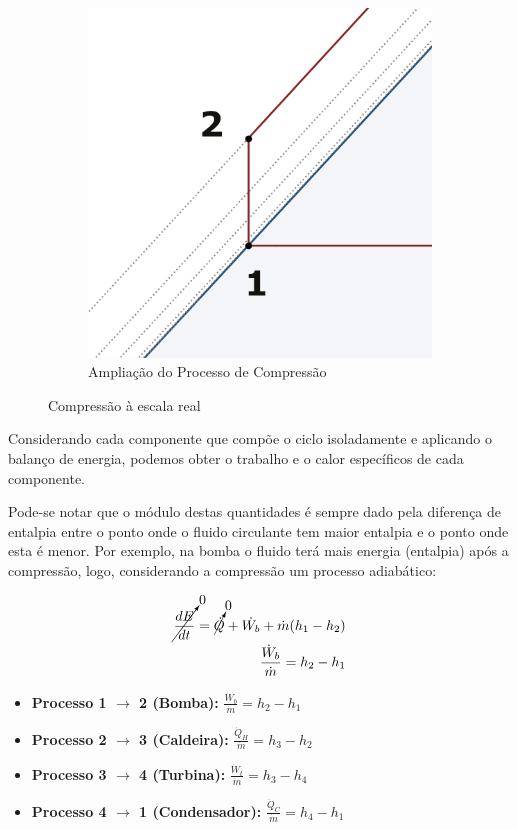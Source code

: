 \begin{figure}[H]
\begin{subfigure}{0.4\textwidth}
        \includegraphics[width=\textwidth]{graphs/pump-amp.png}
        \caption{Ampliação do Processo de Compressão}
        \label{fig:rankine-pump-amp}
    \end{subfigure}
    \caption{Compressão à escala real}
\end{figure}

Considerando cada componente que compõe o ciclo isoladamente e aplicando o balanço de energia, podemos obter o trabalho e o calor específicos de cada componente.

Pode-se notar que o módulo destas quantidades é sempre dado pela diferença de entalpia entre o ponto onde o fluido circulante tem maior entalpia e o ponto onde esta é menor. Por exemplo, na bomba o fluido terá mais energia (entalpia) após a compressão, logo, considerando a compressão um processo adiabático:

\begin{eqnarray*}
    \cancelto{0}{\frac{dE}{dt}} = \cancelto{0}{\dot{Q}} + \dot{W_b} + \dot{m} (h_1 - h_2) \\
    \frac{\dot{W}_b}{\dot{m}} = h_2 - h_1
\end{eqnarray*}

\begin{itemize}
    \item \textbf{Processo 1 $\rightarrow$ 2 (Bomba):} $\frac{\dot{W}_b}{\dot{m}} = h_2 - h_1$
    \item \textbf{Processo 2 $\rightarrow$ 3 (Caldeira):} $\frac{\dot{Q}_H}{\dot{m}} = h_3 - h_2$
    \item \textbf{Processo 3 $\rightarrow$ 4 (Turbina):} $\frac{\dot{W}_t}{\dot{m}} = h_3 - h_4$
    \item \textbf{Processo 4 $\rightarrow$ 1 (Condensador):} $\frac{\dot{Q}_C}{\dot{m}} = h_4 - h_1$
\end{itemize}

